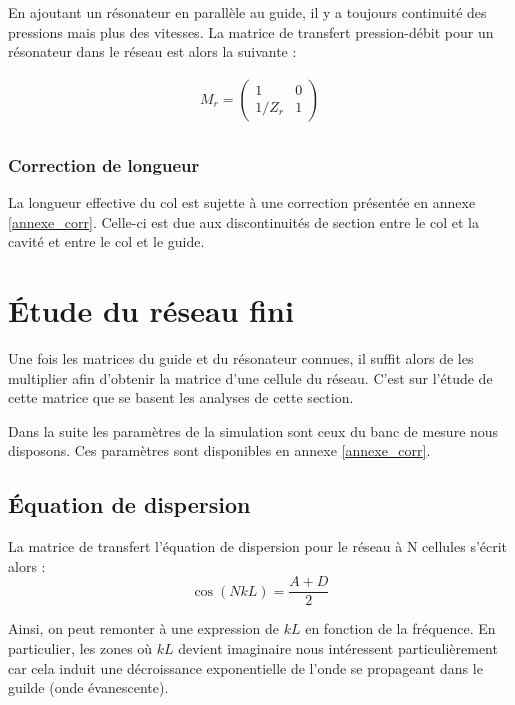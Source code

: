 En ajoutant un résonateur en parallèle au guide, il y a toujours continuité des pressions mais plus des vitesses. La matrice de transfert pression-débit pour un résonateur dans le réseau est alors la suivante :

\begin{eqnarray*}
M_{r} = \begin{pmatrix} 1 &  0 \\ 1 /Z_{r} & 1  \end{pmatrix}\\
\end{eqnarray*}


\subsubsection{Correction de longueur}
La longueur effective du col est sujette à une correction présentée en annexe \ref{annexe_corr}. Celle-ci est due aux discontinuités de section entre le col et la cavité et entre le col et le guide.\\



\section{Étude du réseau fini}

Une fois les matrices du guide et du résonateur connues, il suffit alors de les multiplier afin d'obtenir la matrice d'une cellule du réseau. C'est sur l'étude de cette matrice que se basent les analyses de cette section. 

Dans la suite les paramètres de la simulation sont ceux du banc de mesure nous disposons. Ces paramètres sont disponibles en annexe \ref{annexe_corr}.

\subsection{Équation de dispersion}
La matrice de transfert l'équation de dispersion pour le réseau à N cellules s'écrit alors : 
\begin{equation}\label{eq_dispersion}
\cos(NkL) = \frac{A+D}{2} 
\end{equation}

Ainsi, on peut remonter à une expression de $kL$ en fonction de la fréquence. En particulier, les zones où $kL$ devient imaginaire nous intéressent particulièrement car cela induit une décroissance exponentielle de l'onde se propageant dans le guilde (onde évanescente).

